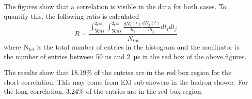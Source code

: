 The figures show that a correlation is visible in the data for both cases. To quantify this, the following ratio is calculated
\begin{equation}\label{eq:CorrelCalcul}
	R = \frac{\int_{50 ns}^{2 \mu s} \int_{50 ns}^{2 \mu s} \frac{dN_i(t)}{dt_i} \frac{dN_j(t)}{dt_j} dt_i dt_j}{N_{tot}}
\end{equation}
where N$_{tot}$ is the total number of entries in the histogram and the nominator is the number of entries between 50 ns and \SI{2}{\micro\second} in the red box of the above figures.

The results show that 18.19\% of the entries are in the red box region for the short correlation. This may come from EM sub-showers in the hadron shower. For the long correlation, 3.24\% of the entries are in the red box region.

